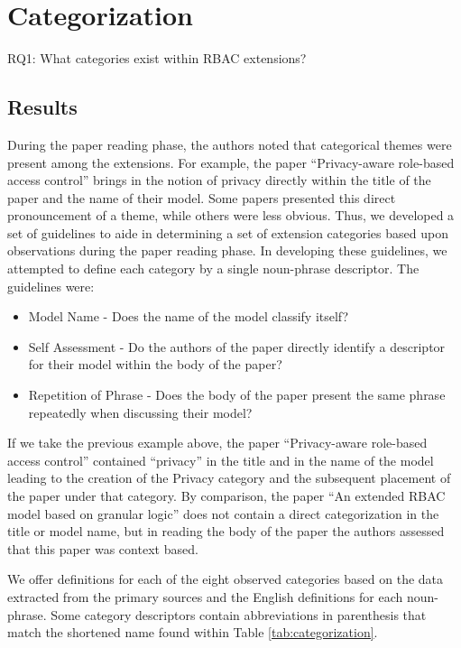 \section{Categorization} \label{sec:categorization}

RQ1: What categories exist within RBAC extensions?

\subsection{Results}

During the paper reading phase, the authors noted that categorical themes were present among the extensions. 
For example, the paper ``Privacy-aware role-based access control'' \cite{ni2010privacy} brings in the notion of privacy directly within the title of the paper and the name of their model. 
Some papers presented this direct pronouncement of a theme, while others were less obvious. 
Thus, we developed a set of guidelines to aide in determining a set of extension categories based upon observations during the paper reading phase. 
In developing these guidelines, we attempted to define each category by a single noun-phrase descriptor.
The guidelines were:

\begin{itemize}
\item Model Name - Does the name of the model classify itself?
\item Self Assessment - Do the authors of the paper directly identify a descriptor for their model within the body of the paper?
\item Repetition of Phrase - Does the body of the paper present the same phrase repeatedly when discussing their model?
\end{itemize}

If we take the previous example above, the paper ``Privacy-aware role-based access control'' \cite{ni2010privacy} contained ``privacy'' in
the title and in the name of the model leading to the creation of the Privacy category and the subsequent placement of the paper under that category.
By comparison, the paper ``An extended RBAC model based on granular logic'' \cite{jian2008extended} does not contain a direct categorization in the title or model name, but in reading the body of the paper the authors assessed that this paper was context based.  

We offer definitions for each of the eight observed categories based on the data extracted from the primary sources and the English definitions for each noun-phrase. 
Some category descriptors contain abbreviations in parenthesis that match the shortened name found within Table \ref{tab:categorization}.

